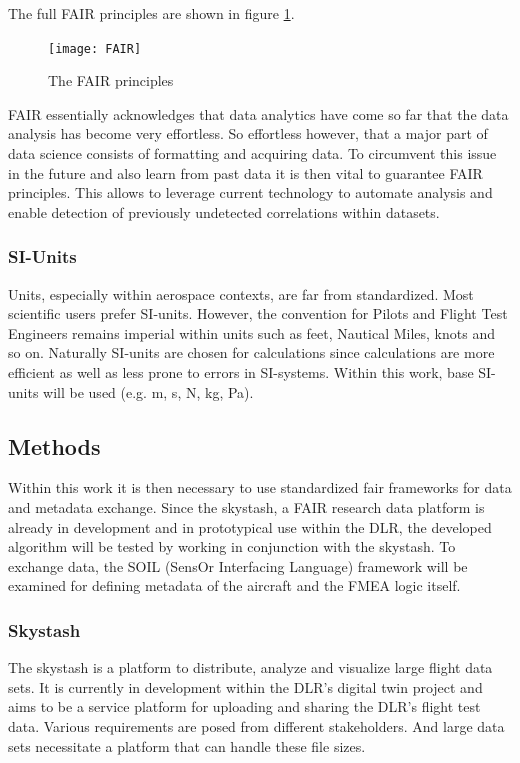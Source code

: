 The full FAIR principles are shown in figure \ref{fig:FAIR}.\cite{wilkinson_fair_2016}

\begin{figure}[h]
    \centering
    \texttt{[image: FAIR]}
    \caption{The FAIR principles \cite{wilkinson_fair_2016}}
    \label{fig:FAIR}
\end{figure}


FAIR essentially acknowledges that data analytics have come so far that the data analysis has become very effortless. So effortless however, that a major part of data science consists of formatting and acquiring data. To circumvent this issue in the future and also learn from past data it is then vital to guarantee FAIR principles. This allows to leverage current technology to automate analysis and enable detection of previously undetected correlations within datasets.

\subsubsection{SI-Units}
Units, especially within aerospace contexts, are far from standardized. Most scientific users prefer SI-units. However, the convention for Pilots and Flight Test Engineers remains imperial within units such as feet, Nautical Miles, knots and so on. Naturally SI-units are chosen for calculations since calculations are more efficient as well as less prone to errors in SI-systems. Within this work, base SI-units will be used (e.g. m, s, N, kg, Pa).

\subsection{Methods}

Within this work it is then necessary to use standardized fair frameworks for data and metadata exchange. Since the skystash, a FAIR research data platform is already in development and in prototypical use within the DLR, the developed algorithm will be tested by working in conjunction with the skystash. To exchange data, the SOIL (SensOr Interfacing Language) framework will be examined for defining metadata of the aircraft and the FMEA logic itself.

\subsubsection{Skystash}
\label{chap:skystash}
The skystash is a platform to distribute, analyze and visualize large flight data sets. It is currently in development within the DLR's digital twin project and aims to be a service platform for uploading and sharing the DLR's flight test data. Various requirements are posed from different stakeholders. And large data sets necessitate a platform that can handle these file sizes.

